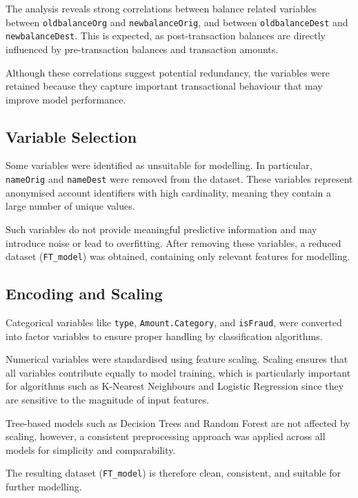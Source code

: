 \documentclass{article}
\begin{document}
The analysis reveals strong correlations between balance related variables between \texttt{oldbalanceOrg} and \texttt{newbalanceOrig}, and between \texttt{oldbalanceDest} and \texttt{newbalanceDest}. This is expected, as post-transaction balances are directly influenced by pre-transaction balances and transaction amounts.

Although these correlations suggest potential redundancy, the variables were retained because they capture important transactional behaviour that may improve model performance.


\subsection{Variable Selection}

Some variables were identified as unsuitable for modelling. In particular, \texttt{nameOrig} and \texttt{nameDest} were removed from the dataset. These variables represent anonymised account identifiers with high cardinality, meaning they contain a large number of unique values.

Such variables do not provide meaningful predictive information and may introduce noise or lead to overfitting. After removing these variables, a reduced dataset (\texttt{FT\_model}) was obtained, containing only relevant features for modelling.

\subsection{Encoding and Scaling}

Categorical variables like \texttt{type}, \texttt{Amount.Category}, and \texttt{isFraud}, were converted into factor variables to ensure proper handling by classification algorithms.

Numerical variables were standardised using feature scaling. Scaling ensures that all variables contribute equally to model training, which is particularly important for algorithms such as K-Nearest Neighbours and Logistic Regression since they are sensitive to the magnitude of input features.

Tree-based models such as Decision Trees and Random Forest are not affected by scaling, however, a consistent preprocessing approach was applied across all models for simplicity and comparability.

The resulting dataset (\texttt{FT\_model}) is therefore clean, consistent, and suitable for further modelling.
\end{document}
